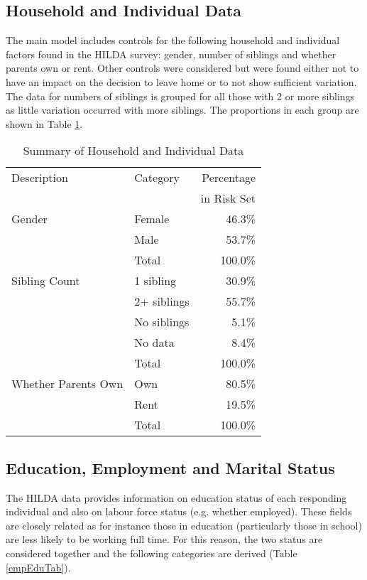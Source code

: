 \documentclass[12pt]{article}
\begin{document}
\subsection{Household and Individual Data}

The main model includes controls for the following household and individual factors found in the HILDA survey: gender, number of siblings and whether parents own or rent.  Other controls were considered but were found either not to have an impact on the decision to leave home or to not show sufficient variation. The data for numbers of siblings is grouped for all those with 2 or more siblings as little variation occurred with more siblings. The proportions in each group are shown in Table \ref{HILDATab}.

\begin{table}[htpb]
\centering
\caption{Summary of Household and Individual Data}
\label{HILDATab}
\begin{tabular}{llr}
\toprule
Description & Category & Percentage \\
&& in Risk Set \\
\midrule
Gender & Female &  46.3\% \\
   & Male &  53.7\% \\
   & Total & 100.0\% \\
\midrule
Sibling Count & 1 sibling &  30.9\% \\
   & 2+ siblings &  55.7\% \\
   & No siblings &   5.1\% \\
   & No data &   8.4\% \\
   & Total & 100.0\% \\
\midrule
Whether Parents Own & Own &  80.5\% \\
    & Rent &  19.5\% \\
    & Total & 100.0\% \\
\bottomrule
\end{tabular}
\end{table}

\subsection{Education, Employment and Marital Status}

The HILDA data provides information on education status of each responding individual and also on labour force status (e.g. whether employed). These fields are closely related as for instance those in education (particularly those in school) are less likely to be working full time. For this reason, the two status are considered together and the following categories are derived (Table \ref{empEduTab}).
\end{document}
